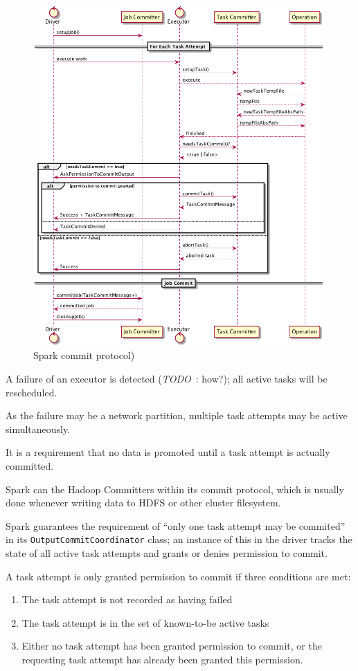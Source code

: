 \documentclass[conference]{IEEEtran}
\newcommand{\TODO}{\emph{TODO}\ }
\begin{document}
\begin{figure}
  \centering
  \includegraphics[width=.8\textwidth]{spark-protocol.png}
  \caption{Spark commit protocol)}
  \label{fig:spark-protocol}
\end{figure}


A failure of an executor is detected (\TODO: how?);
all active tasks will be rescheduled.

As the failure may be a network partition, multiple task attempts may be active
simultaneously.

It is a requirement that no data is promoted until a task attempt is actually
committed.


Spark can the Hadoop Committers within its commit protocol,
which is usually done whenever writing data to HDFS or other cluster filesystem.

Spark guarantees the requirement of ``only one task attempt may be commited''
in its \texttt{OutputCommitCoordinator} class;
an instance of this in the driver tracks the state of all active task attempts
and grants or denies permission to commit.

A task attempt is only granted permission to commit if three conditions
are met:

\begin{enumerate}
  \item The task attempt is not recorded as having failed
  \item The task attempt is in the set of known-to-be active tasks
  \item Either no task attempt has been granted permission to commit, or
  the requesting task attempt has already been granted this permission.
\end{enumerate}
\end{document}

